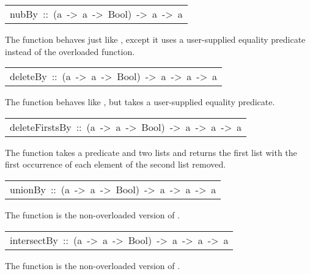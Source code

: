 \begin{haddockdesc}
\item[\begin{tabular}{@{}l}
nubBy\ ::\ (a\ ->\ a\ ->\ Bool)\ ->\ {\char 91}a{\char 93}\ ->\ {\char 91}a{\char 93}
\end{tabular}]\haddockbegindoc
The  function behaves just like , except it uses a
 user-supplied equality predicate instead of the overloaded \haddockid{==}
 function.
\par

\end{haddockdesc}
\begin{haddockdesc}
\item[\begin{tabular}{@{}l}
deleteBy\ ::\ (a\ ->\ a\ ->\ Bool)\ ->\ a\ ->\ {\char 91}a{\char 93}\ ->\ {\char 91}a{\char 93}
\end{tabular}]\haddockbegindoc
The  function behaves like , but takes a
 user-supplied equality predicate.
\par

\end{haddockdesc}
\begin{haddockdesc}
\item[\begin{tabular}{@{}l}
deleteFirstsBy\ ::\ (a\ ->\ a\ ->\ Bool)\ ->\ {\char 91}a{\char 93}\ ->\ {\char 91}a{\char 93}\ ->\ {\char 91}a{\char 93}
\end{tabular}]\haddockbegindoc
The  function takes a predicate and two lists and
 returns the first list with the first occurrence of each element of
 the second list removed.
\par

\end{haddockdesc}
\begin{haddockdesc}
\item[\begin{tabular}{@{}l}
unionBy\ ::\ (a\ ->\ a\ ->\ Bool)\ ->\ {\char 91}a{\char 93}\ ->\ {\char 91}a{\char 93}\ ->\ {\char 91}a{\char 93}
\end{tabular}]\haddockbegindoc
The  function is the non-overloaded version of .
\par

\end{haddockdesc}
\begin{haddockdesc}
\item[\begin{tabular}{@{}l}
intersectBy\ ::\ (a\ ->\ a\ ->\ Bool)\ ->\ {\char 91}a{\char 93}\ ->\ {\char 91}a{\char 93}\ ->\ {\char 91}a{\char 93}
\end{tabular}]\haddockbegindoc
The  function is the non-overloaded version of .
\par

\end{haddockdesc}
